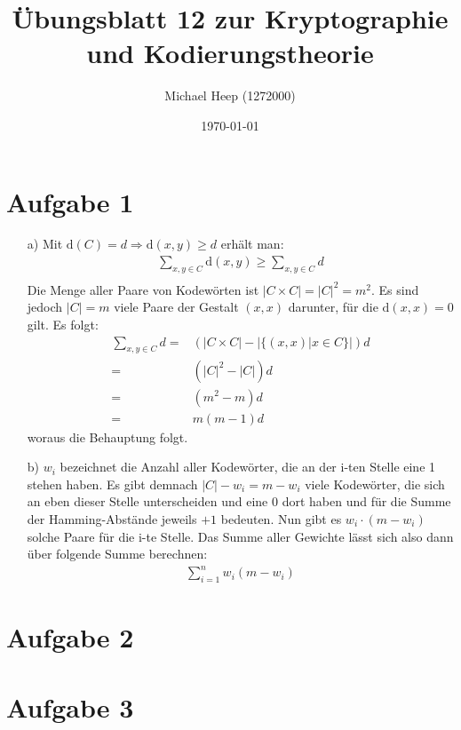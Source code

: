 \documentclass[12pt,a4paper]{scrartcl}
\title{Übungsblatt 12 zur Kryptographie und Kodierungstheorie}
\author{Michael Heep (1272000)}
\date{\today}
\begin{document}
\maketitle

\section*{Aufgabe 1}
\begin{enumerate}
\item[a)]
Mit $\text{d}(C)=d \Rightarrow \text{d}(x,y) \geq d$ erhält man:
\begin{align*}
\sum_{x,y \in C} \text{d}(x,y) \geq \sum_{x,y \in C} d \\
\end{align*}
Die Menge aller Paare von Kodewörten ist $|C \times C| = |C|^2 = m^2$. Es sind jedoch $|C|=m$ viele Paare der Gestalt $(x,x)$ darunter, für die $\text{d}(x,x)=0$ gilt. Es folgt:
\begin{align*}
\sum_{x,y \in C} d = & \left( |C \times C| - |\lbrace (x,x) | x \in C \rbrace| \right) d \\
= & \left( |C|^2-|C| \right)d \\
= & \left( m^2 - m\right) d \\
= & m \left( m - 1 \right) d
\end{align*}
woraus die Behauptung folgt.
\item[b)]
$w_i$ bezeichnet die Anzahl aller Kodewörter, die an der i-ten Stelle eine 1 stehen haben. Es gibt demnach $|C|-w_i=m-w_i$ viele Kodewörter, die sich an eben dieser Stelle unterscheiden und eine 0 dort haben und für die Summe der Hamming-Abstände jeweils $+1$ bedeuten. Nun gibt es $w_i \cdot (m-w_i)$ solche Paare für die i-te Stelle. Das Summe aller Gewichte lässt sich also dann über folgende Summe berechnen:
\begin{align*}
    \sum_{i=1}^{n} w_i(m-w_i)
\end{align*}
\end{enumerate}

\section*{Aufgabe 2}

\section*{Aufgabe 3}
\end{document}
